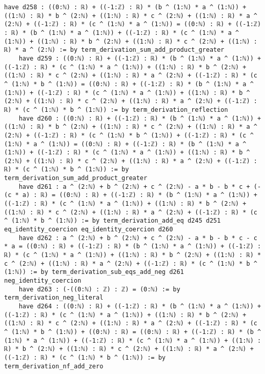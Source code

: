 \documentclass{article}
\begin{document}
\begin{tcolorbox}[colback=white!10, width=\linewidth]
\begin{lstlisting}[language=Lean4]
    have d258 : ((0:ℕ) : ℝ) + ((-1:ℤ) : ℝ) * (b ^ (1:ℕ) * a ^ (1:ℕ)) + ((1:ℕ) : ℝ) * b ^ (2:ℕ) + ((1:ℕ) : ℝ) * c ^ (2:ℕ) + ((1:ℕ) : ℝ) * a ^ (2:ℕ) + ((-1:ℤ) : ℝ) * (c ^ (1:ℕ) * a ^ (1:ℕ)) = ((0:ℕ) : ℝ) + ((-1:ℤ) : ℝ) * (b ^ (1:ℕ) * a ^ (1:ℕ)) + ((-1:ℤ) : ℝ) * (c ^ (1:ℕ) * a ^ (1:ℕ)) + ((1:ℕ) : ℝ) * b ^ (2:ℕ) + ((1:ℕ) : ℝ) * c ^ (2:ℕ) + ((1:ℕ) : ℝ) * a ^ (2:ℕ) := by term_derivation_sum_add_product_greater
    have d259 : ((0:ℕ) : ℝ) + ((-1:ℤ) : ℝ) * (b ^ (1:ℕ) * a ^ (1:ℕ)) + ((-1:ℤ) : ℝ) * (c ^ (1:ℕ) * a ^ (1:ℕ)) + ((1:ℕ) : ℝ) * b ^ (2:ℕ) + ((1:ℕ) : ℝ) * c ^ (2:ℕ) + ((1:ℕ) : ℝ) * a ^ (2:ℕ) + ((-1:ℤ) : ℝ) * (c ^ (1:ℕ) * b ^ (1:ℕ)) = ((0:ℕ) : ℝ) + ((-1:ℤ) : ℝ) * (b ^ (1:ℕ) * a ^ (1:ℕ)) + ((-1:ℤ) : ℝ) * (c ^ (1:ℕ) * a ^ (1:ℕ)) + ((1:ℕ) : ℝ) * b ^ (2:ℕ) + ((1:ℕ) : ℝ) * c ^ (2:ℕ) + ((1:ℕ) : ℝ) * a ^ (2:ℕ) + ((-1:ℤ) : ℝ) * (c ^ (1:ℕ) * b ^ (1:ℕ)) := by term_derivation_reflection
    have d260 : ((0:ℕ) : ℝ) + ((-1:ℤ) : ℝ) * (b ^ (1:ℕ) * a ^ (1:ℕ)) + ((1:ℕ) : ℝ) * b ^ (2:ℕ) + ((1:ℕ) : ℝ) * c ^ (2:ℕ) + ((1:ℕ) : ℝ) * a ^ (2:ℕ) + ((-1:ℤ) : ℝ) * (c ^ (1:ℕ) * b ^ (1:ℕ)) + ((-1:ℤ) : ℝ) * (c ^ (1:ℕ) * a ^ (1:ℕ)) = ((0:ℕ) : ℝ) + ((-1:ℤ) : ℝ) * (b ^ (1:ℕ) * a ^ (1:ℕ)) + ((-1:ℤ) : ℝ) * (c ^ (1:ℕ) * a ^ (1:ℕ)) + ((1:ℕ) : ℝ) * b ^ (2:ℕ) + ((1:ℕ) : ℝ) * c ^ (2:ℕ) + ((1:ℕ) : ℝ) * a ^ (2:ℕ) + ((-1:ℤ) : ℝ) * (c ^ (1:ℕ) * b ^ (1:ℕ)) := by term_derivation_sum_add_product_greater
    have d261 : a ^ (2:ℕ) + b ^ (2:ℕ) + c ^ (2:ℕ) - a * b - b * c + (-(c * a) : ℝ) = ((0:ℕ) : ℝ) + ((-1:ℤ) : ℝ) * (b ^ (1:ℕ) * a ^ (1:ℕ)) + ((-1:ℤ) : ℝ) * (c ^ (1:ℕ) * a ^ (1:ℕ)) + ((1:ℕ) : ℝ) * b ^ (2:ℕ) + ((1:ℕ) : ℝ) * c ^ (2:ℕ) + ((1:ℕ) : ℝ) * a ^ (2:ℕ) + ((-1:ℤ) : ℝ) * (c ^ (1:ℕ) * b ^ (1:ℕ)) := by term_derivation_add_eq d245 d251 eq_identity_coercion eq_identity_coercion d260
    have d262 : a ^ (2:ℕ) + b ^ (2:ℕ) + c ^ (2:ℕ) - a * b - b * c - c * a = ((0:ℕ) : ℝ) + ((-1:ℤ) : ℝ) * (b ^ (1:ℕ) * a ^ (1:ℕ)) + ((-1:ℤ) : ℝ) * (c ^ (1:ℕ) * a ^ (1:ℕ)) + ((1:ℕ) : ℝ) * b ^ (2:ℕ) + ((1:ℕ) : ℝ) * c ^ (2:ℕ) + ((1:ℕ) : ℝ) * a ^ (2:ℕ) + ((-1:ℤ) : ℝ) * (c ^ (1:ℕ) * b ^ (1:ℕ)) := by term_derivation_sub_eqs_add_neg d261 neg_identity_coercion
    have d263 : (-((0:ℕ) : ℤ) : ℤ) = (0:ℕ) := by term_derivation_neg_literal
    have d264 : ((0:ℕ) : ℝ) + ((-1:ℤ) : ℝ) * (b ^ (1:ℕ) * a ^ (1:ℕ)) + ((-1:ℤ) : ℝ) * (c ^ (1:ℕ) * a ^ (1:ℕ)) + ((1:ℕ) : ℝ) * b ^ (2:ℕ) + ((1:ℕ) : ℝ) * c ^ (2:ℕ) + ((1:ℕ) : ℝ) * a ^ (2:ℕ) + ((-1:ℤ) : ℝ) * (c ^ (1:ℕ) * b ^ (1:ℕ)) + ((0:ℕ) : ℝ) = ((0:ℕ) : ℝ) + ((-1:ℤ) : ℝ) * (b ^ (1:ℕ) * a ^ (1:ℕ)) + ((-1:ℤ) : ℝ) * (c ^ (1:ℕ) * a ^ (1:ℕ)) + ((1:ℕ) : ℝ) * b ^ (2:ℕ) + ((1:ℕ) : ℝ) * c ^ (2:ℕ) + ((1:ℕ) : ℝ) * a ^ (2:ℕ) + ((-1:ℤ) : ℝ) * (c ^ (1:ℕ) * b ^ (1:ℕ)) := by term_derivation_nf_add_zero

\end{lstlisting}
\end{tcolorbox}
\end{document}

